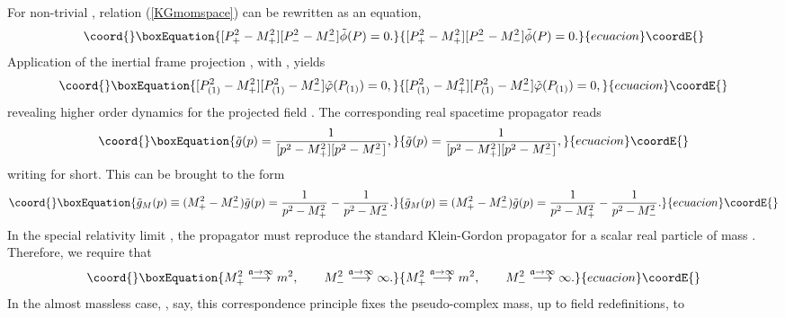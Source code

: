 \documentclass[a4paper,aps,prd,showkeys,showpacs,superscriptaddress,preprint]{revtex4}
\providecommand{\pc}{\mathbb{P}}
\begin{document}
For non-trivial \myHighlight{$\tilde \phi$}\coordHE{}, relation (\ref{KGmomspace}) can be rewritten as
an equation,
\begin{equation}\coord{}\boxEquation{
  [P_+^2 - M_+^2][P_-^2 - M_-^2] \tilde \phi(P) = 0.
}{
  [P_+^2 - M_+^2][P_-^2 - M_-^2] \tilde \phi(P) = 0.
}{ecuacion}\coordE{}\end{equation}
Application of the inertial frame projection \myHighlight{$\tilde \phi \mapsto \tilde
\varphi$}\coordHE{}, with \coordHE{}, yields
\begin{equation}\coord{}\boxEquation{\label{projectedtheory}
  [P_{(1)}^2 - M_+^2][P_{(1)}^2 - M_-^2] \tilde\varphi(P_{(1)}) = 0,
}{[P_{(1)}^2 - M_+^2][P_{(1)}^2 - M_-^2] \tilde\varphi(P_{(1)}) = 0,
}{ecuacion}\coordE{}\end{equation}
revealing higher order dynamics for the projected field \myHighlight{$\varphi$}\coordHE{}. The
corresponding real spacetime propagator reads
\begin{equation}\coord{}\boxEquation{
  \tilde g(p) = \frac{1}{[p^2 - M_+^2][p^2 - M_-^2]},
}{
  \tilde g(p) = \frac{1}{[p^2 - M_+^2][p^2 - M_-^2]},
}{ecuacion}\coordE{}\end{equation} 
writing \coordHE{} for short. This can be brought to the form
\begin{equation}\coord{}\boxEquation{\label{PVprop}
  \tilde g_M(p) \equiv (M_+^2-M_-^2) \tilde g(p) = \frac{1}{p^2-M_+^2}
  - \frac{1}{p^2 - M_-^2}.
}{\tilde g_M(p) \equiv (M_+^2-M_-^2) \tilde g(p) = \frac{1}{p^2-M_+^2}
  - \frac{1}{p^2 - M_-^2}.
}{ecuacion}\coordE{}\end{equation}
In the special relativity limit \coordHE{},
the propagator 
\coordHE{} must reproduce the standard Klein-Gordon propagator
for a scalar real particle of mass \coordHE{}. Therefore, we require that
\begin{equation}\coord{}\boxEquation{
  M_+^2 \stackrel{\mathfrak{a}\rightarrow \infty}{\longrightarrow} m^2,
  \qquad M_-^2 \stackrel{\mathfrak{a}\rightarrow \infty}{\longrightarrow} \infty.}{
  M_+^2 \stackrel{\mathfrak{a}\rightarrow \infty}{\longrightarrow} m^2,
  \qquad M_-^2 \stackrel{\mathfrak{a}\rightarrow \infty}{\longrightarrow} \infty.}{ecuacion}\coordE{}\end{equation}
In the almost massless case, \myHighlight{$M\in\pc^0_-$}\coordHE{}, say, this correspondence
  principle fixes the pseudo-complex mass, up to field redefinitions, to
\end{document}
